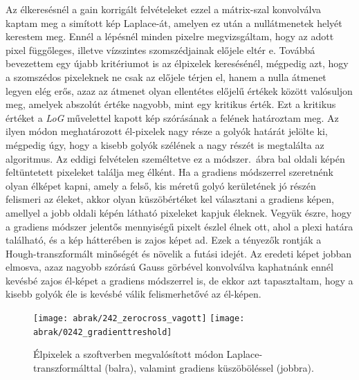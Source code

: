 \documentclass[a4paper,12pt]{article}
\begin{document}
Az élkeresésnél a gain korrigált felvételeket ezzel a mátrix-szal konvolválva kaptam meg a simított kép Laplace-át, amelyen ez után a nullátmenetek helyét kerestem meg. Ennél a lépésnél minden pixelre megvizsgáltam, hogy az adott pixel függőleges, illetve vízszintes szomszédjainak előjele eltér e. Továbbá bevezettem egy újabb kritériumot is az  élpixelek keresésénél, mégpedig azt, hogy a szomszédos pixeleknek ne csak az előjele térjen el, hanem a nulla átmenet legyen elég erős, azaz az átmenet olyan ellentétes előjelű értékek között valósuljon meg, amelyek abszolút értéke nagyobb, mint egy kritikus érték. Ezt a kritikus értéket a \emph{LoG} művelettel kapott kép szórásának a felének határoztam meg. Az ilyen módon meghatározott él-pixelek nagy része a golyók határát jelölte ki, mégpedig úgy, hogy a kisebb golyók szélének a nagy részét is megtalálta az algoritmus. Az eddigi felvételen személtetve ez a módszer.~ábra bal oldali képén feltüntetett pixeleket találja meg élként. Ha a gradiens módszerrel szeretnénk olyan élképet kapni, amely a felső, kis méretű golyó kerületének jó részén felismeri az éleket, akkor olyan küszöbértéket kel választani a gradiens képen, amellyel a jobb oldali képén látható pixeleket kapjuk éleknek. Vegyük észre, hogy a gradiens módszer jelentős mennyiségű pixelt észlel élnek ott, ahol a plexi határa található, és a kép hátterében is zajos képet ad. Ezek a tényezők rontják a Hough-transzformált minőségét és növelik a futási idejét. Az eredeti képet jobban elmosva, azaz nagyobb szórású Gauss görbével konvolválva kaphatnánk ennél kevésbé zajos él-képet a gradiens módszerrel is, de ekkor azt tapasztaltam, hogy a kisebb golyók éle is kevésbé válik felismerhetővé az él-képen. 


\begin{figure}[htbp]
\center
\texttt{[image: abrak/242\_zerocross\_vagott]}
\texttt{[image: abrak/0242\_gradienttreshold]}
\caption{Élpixelek a szoftverben megvalósított módon Laplace-transzformálttal (balra), valamint gradiens küszöböléssel (jobbra).}
\label{fig:242_circles}
\end{figure}
\end{document}
